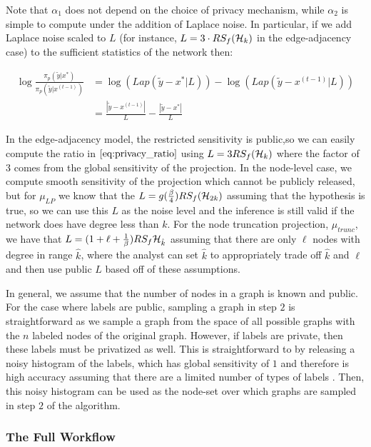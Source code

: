 Note that $\alpha_1$ does not depend on the choice of privacy mechanism, while $\alpha_2$ is simple to compute under the addition of Laplace noise. In particular, if we add Laplace noise scaled to $L$ (for instance, $L= 3 \cdot RS_f(\mathcal{H}_k)$ in the edge-adjacency case) to the sufficient statistics of the network then:

\begin{align}
\label{eq:privacy_ratio}
\log \frac{\pi_p(\tilde{y} | x^*) }{\pi_p(\tilde{y} | x^{(t-1)})} & = \log \left(Lap\left(\tilde{y} - x^*  | L \right)  \right) -  \log \left(Lap\left(\tilde{y} - x^{(t-1)}  | L \right) \right) \\ \nonumber
& = \frac{|\tilde{y} - x^{(t-1)} | }{L} - \frac{|\tilde{y} - x^* | }{L}
\end{align}

 In the edge-adjacency model, the restricted sensitivity is public,so  we can easily compute the ratio in $\cref{eq:privacy_ratio}$ using $L=3RS_f(\mathcal{H}_k)$ where the factor of $3$ comes from the global sensitivity of the projection. In the node-level case, we compute smooth sensitivity of the projection which cannot be publicly released, but for $\mu_{LP}$ we know that the $L = g(\frac{\beta}{4}) RS_f(\mathcal{H}_{2k})$ assuming that the hypothesis is true, so we can use this $L$ as the noise level and the inference is still valid if the network does have degree less than $k$. For the node truncation projection, $\mu_{trunc}$, we have that $L=(1 + \ell + \frac{1}{\beta}) RS_f{\mathcal{H}_{\hat{k}}}$ assuming that there are only $\ell$ nodes with degree in range $\hat{k}$, where the analyst can set $\hat{k}$ to appropriately trade off $\hat{k}$ and $\ell$ and then use public $L$ based off of these assumptions. 
 
 In general, we assume that the number of nodes in a graph is known and public. For the case where labels are public, sampling a graph in step $2$ is straightforward as we sample a graph from the space of all possible graphs with the $n$ labeled nodes of the original graph. However, if labels are private, then these labels must be privatized as well. This is straightforward to by releasing a noisy histogram of the labels, which has global sensitivity of $1$ and therefore is high accuracy assuming that there are a limited number of types of labels \cite{DMNS06}. Then, this noisy histogram can be used as the node-set over which graphs are sampled in step $2$ of the algorithm.

\subsubsection{The Full Workflow}

